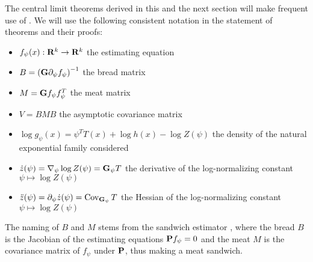 \begin{notation}
    \label{not:notation-clt}
    The central limit theorems derived in this and the next section will make frequent use of . We will use the following consistent notation in the statement of theorems and their proofs:
    \begin{itemize}
        \item $f_\psi(x): \R^{k} \to \R^{k}$ the estimating equation              
        \item $B = \left(\G\partial_{\psi} f_{\psi}\right)^{-1}$ the bread matrix
        \item $M = \G f_{\psi}f_{\psi}^{T}$ the meat matrix
        \item $V = BMB$ the asymptotic covariance matrix
        \item $\log g_{\psi}(x) = \psi^{T}T(x) + \log h(x) - \log Z(\psi)$ the density of the natural exponential family considered
        \item $\dot z (\psi) = \nabla_{\psi}\log Z(\psi) = \G_{\psi} T$ the derivative of the log-normalizing constant $\psi \mapsto \log Z(\psi)$
        \item $\ddot z(\psi) = \partial_{\psi} \dot z(\psi) =\cov_{\G_{\psi}}T$ the Hessian of the log-normalizing constant $\psi \mapsto \log Z(\psi)$
    \end{itemize}
    The naming of $B$ and $M$ stems from the sandwich estimator \citep{White1982Maximum}, where the bread $B$ is the Jacobian of the estimating equations $\P f_{\psi} = 0$ and the meat $M$ is the covariance matrix of $f_{\psi}$ under $\P$, thus making a \glqq{}meat sandwich\grqq{}.
\end{notation}

\begin{theorem}
    \label{thm:ce-consistent}
\end{theorem}


